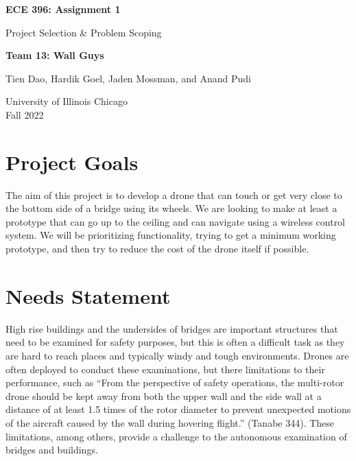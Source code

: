 \documentclass[12pt]{article}
\begin{document}
    \begin{titlepage}
        \begin{center}
            \vspace*{1cm}
            \Huge\textbf{ECE 396: Assignment 1}

                \vspace{0.5cm}
                \LARGE Project Selection \& Problem Scoping
    
            \vspace{1.5cm}
            \textbf{Team 13: Wall Guys}

                \vspace{0.5cm}
                Tien Dao, Hardik Goel, Jaden Mossman, and Anand Pudi

            \vfill             

            \vspace{0.8cm}
            University of Illinois Chicago\\
            Fall 2022
                
        \end{center}
    \end{titlepage}

    \tableofcontents

    \newpage

    \section{Project Goals}
        The aim of this project is to develop a drone that can touch or get very close to the bottom side of a bridge using its wheels. We are looking to make at least a prototype that can go up to the ceiling and can navigate using a wireless control system. We will be prioritizing functionality, trying to get a minimum working prototype, and then try to reduce the cost of the drone itself if possible.

    \section{Needs Statement}
        High rise buildings and the undersides of bridges are important structures that need to be examined for safety purposes, but this is often a difficult task as they are hard to reach places and typically windy and tough environments. Drones are often deployed to conduct these examinations, but there limitations to their performance, such as “From the perspective of safety operations, the multi-rotor drone should be kept away from both the upper wall and the side wall at a distance of at least 1.5 times of the rotor diameter to prevent unexpected motions of the aircraft caused by the wall during hovering flight.” (Tanabe 344). These limitations, among others, provide a challenge to the autonomous examination of bridges and buildings.
\end{document}
